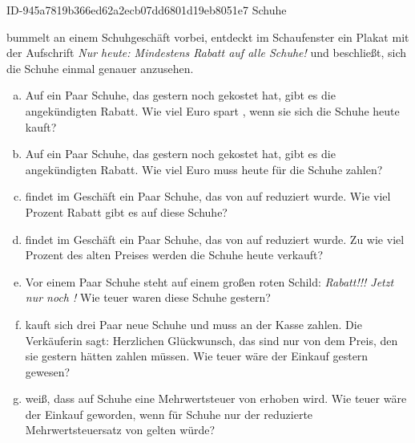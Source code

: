 \begin{exercise}
      {ID-945a7819b366ed62a2ecb07dd6801d19eb8051e7}
      {Schuhe}
  \ifproblem\problem\par
    \xxa{} bummelt an einem Schuhgeschäft vorbei, entdeckt im Schaufenster ein
    Plakat mit der Aufschrift {\itshape\glqq Nur heute: Mindestens  Rabatt
    auf alle Schuhe!\grqq} und beschließt, sich die Schuhe einmal genauer anzusehen.
    \begin{enumerate}[a)]
      \item Auf ein Paar Schuhe, das gestern noch  gekostet hat, gibt es
            die angekündigten  Rabatt. Wie viel Euro spart \xxa, wenn sie
            sich die Schuhe heute kauft?
      \item Auf ein Paar Schuhe, das gestern noch  gekostet hat, gibt es
            die angekündigten  Rabatt. Wie viel Euro muss \xxa{} heute
            für die Schuhe zahlen?
      \item \xxa{} findet im Geschäft ein Paar Schuhe, das von  auf
             reduziert wurde. Wie viel Prozent Rabatt gibt es auf
            diese Schuhe?
      \item \xxa{} findet im Geschäft ein Paar Schuhe, das von  auf
             reduziert wurde. Zu wie viel Prozent des alten
            Preises werden die Schuhe heute verkauft?
      \item Vor einem Paar Schuhe steht auf einem großen roten Schild:
            {\itshape\glqq {} Rabatt!!! Jetzt nur noch !\grqq}
            Wie teuer waren diese Schuhe gestern?
      \item \xxa{} kauft sich drei Paar neue Schuhe und muss an der Kasse
             zahlen. Die Verkäuferin sagt: \glqq Herzlichen
            Glückwunsch, das sind nur  von dem Preis, den sie gestern
            hätten zahlen müssen.\grqq{}
            Wie teuer wäre der Einkauf gestern gewesen?
      \item \xxa{} weiß, dass auf Schuhe eine Mehrwertsteuer von  erhoben
            wird. Wie teuer wäre der Einkauf geworden, wenn für Schuhe nur der
            reduzierte Mehrwertsteuersatz von  gelten würde?
    \end{enumerate}
  \fi
  \ifoutcome\outcome\par
    \begingroup
      \newcommand{\noeq}{\quad&\quad}
      \newcommand{\eqAA}{0,\!25\cdot\text{\eur{76}}&=\text{\eur{19}}}

\end{exercise}
